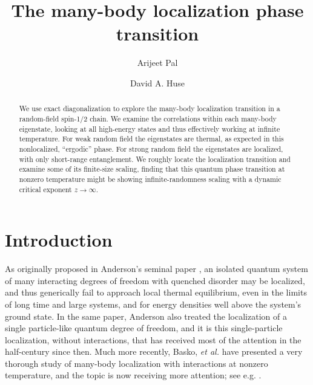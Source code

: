 \documentclass[letterpaper, twocolumn,superscriptaddress, showpacs,preprintnumbers,amsmath,amssymb]{revtex4}
\begin{document}
\title{The many-body localization phase transition} %

\author{Arijeet Pal}

\author{David A. Huse}

\begin{abstract}
We use exact diagonalization to explore the many-body localization transition in a random-field spin-1/2 chain.
We examine the correlations within each many-body eigenstate,
looking at all high-energy states and thus effectively working at infinite temperature.  For weak random field the
eigenstates are thermal, as expected in this nonlocalized, ``ergodic'' phase.  For strong random field the eigenstates are localized,
with only short-range entanglement.  We roughly locate the localization transition and examine
some of its finite-size scaling, %
finding that this quantum phase transition at nonzero temperature might be %
showing infinite-randomness scaling with a dynamic critical exponent $z\rightarrow\infty$.
\end{abstract}


\maketitle


\section{Introduction}

As originally proposed in Anderson's seminal paper \cite{pwa58},
an isolated quantum system of many interacting degrees of freedom with quenched disorder may be localized,
and thus generically fail to approach local thermal equilibrium,
even in the limits of long time and large systems, and for energy densities well above the system's ground state.
In the same paper, Anderson also treated the localization of a single particle-like quantum degree of freedom,
and it is this single-particle localization, without interactions,
that has received most of the attention in the half-century since then.
Much more recently, Basko, {\it et al.} \cite{baa} have presented a very thorough study
of many-body localization with interactions at nonzero temperature,
and the topic is now receiving more attention; see e.g. \cite{gea,OHED,zpp,oph,mm,im,aas,mg,br,fim,gog}.
\end{document}
